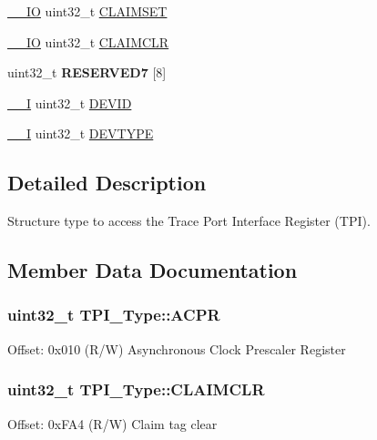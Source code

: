 \begin{DoxyCompactItemize}
\item 
\hyperlink{core__sc300_8h_aec43007d9998a0a0e01faede4133d6be}{\+\_\+\+\_\+\+IO} uint32\+\_\+t \hyperlink{structTPI__Type_a2e4d5a07fabd771fa942a171230a0a84}{C\+L\+A\+I\+M\+S\+ET}
\item 
\hyperlink{core__sc300_8h_aec43007d9998a0a0e01faede4133d6be}{\+\_\+\+\_\+\+IO} uint32\+\_\+t \hyperlink{structTPI__Type_a44efa6045512c8d4da64b0623f7a43ad}{C\+L\+A\+I\+M\+C\+LR}
\item 
uint32\+\_\+t {\bfseries R\+E\+S\+E\+R\+V\+E\+D7} \mbox{[}8\mbox{]}\hypertarget{structTPI__Type_a58e6780b937267874964fb3efa9b96c7}{}\label{structTPI__Type_a58e6780b937267874964fb3efa9b96c7}

\item 
\hyperlink{core__sc300_8h_af63697ed9952cc71e1225efe205f6cd3}{\+\_\+\+\_\+I} uint32\+\_\+t \hyperlink{structTPI__Type_a4b2e0d680cf7e26728ca8966363a938d}{D\+E\+V\+ID}
\item 
\hyperlink{core__sc300_8h_af63697ed9952cc71e1225efe205f6cd3}{\+\_\+\+\_\+I} uint32\+\_\+t \hyperlink{structTPI__Type_a16d12c5b1e12f764fa3ec4a51c5f0f35}{D\+E\+V\+T\+Y\+PE}
\end{DoxyCompactItemize}


\subsection{Detailed Description}
Structure type to access the Trace Port Interface Register (T\+PI). 

\subsection{Member Data Documentation}
\subsubsection[{\texorpdfstring{A\+C\+PR}{ACPR}}]{ uint32\+\_\+t T\+P\+I\+\_\+\+Type\+::\+A\+C\+PR}\hypertarget{structTPI__Type_ad75832a669eb121f6fce3c28d36b7fab}{}\label{structTPI__Type_ad75832a669eb121f6fce3c28d36b7fab}
Offset\+: 0x010 (R/W) Asynchronous Clock Prescaler Register 
\subsubsection[{\texorpdfstring{C\+L\+A\+I\+M\+C\+LR}{CLAIMCLR}}]{ uint32\+\_\+t T\+P\+I\+\_\+\+Type\+::\+C\+L\+A\+I\+M\+C\+LR}\hypertarget{structTPI__Type_a44efa6045512c8d4da64b0623f7a43ad}{}\label{structTPI__Type_a44efa6045512c8d4da64b0623f7a43ad}
Offset\+: 0x\+F\+A4 (R/W) Claim tag clear 
